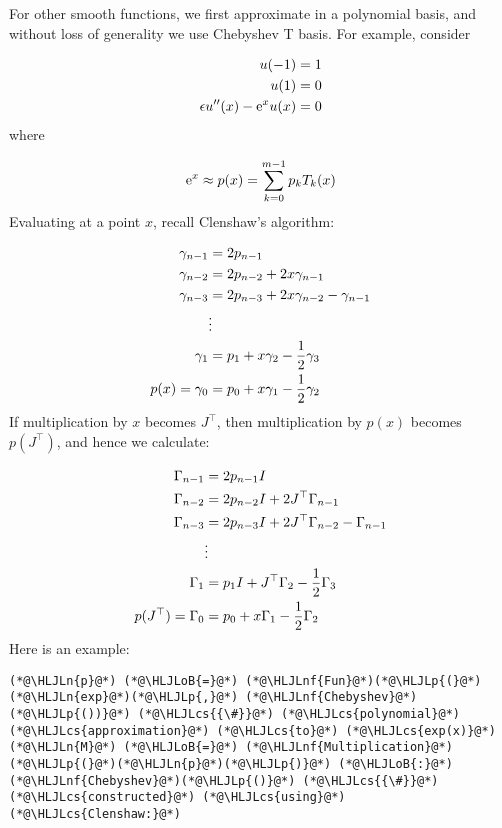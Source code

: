 \documentclass[12pt,landscape]{article}
\newcommand{\HLJLn}[1]{#1}
\newcommand{\HLJLnf}[1]{\textcolor[RGB]{66,102,213}{#1}}
\newcommand{\HLJLoB}[1]{\textcolor[RGB]{102,102,102}{\textbf{#1}}}
\newcommand{\HLJLp}[1]{#1}
\newcommand{\HLJLcs}[1]{\textcolor[RGB]{153,153,119}{\textit{#1}}}
\def\half{ {1 \over 2} }
\def\E{ {\rm e} }
\begin{document}
{For other smooth functions, we first approximate in a polynomial basis,  and without loss of generality we use Chebyshev T basis. For example, consider


\begin{align*}
u(-1) &= 1\\
u(1) &= 0\\
\epsilon u''(x) - \E^x u(x) &= 0
\end{align*}
where

\[
\E^x  \approx p(x) = \sum_{k=0}^{m-1} p_k T_k(x)
\]
Evaluating at a point $x$, recall Clenshaw's algorithm:


\begin{align*}
\gamma_{n-1} &= 2p_{n-1} \\
\gamma_{n-2} &= 2p_{n-2} + 2x \gamma_{n-1} \\
\gamma_{n-3} &= 2 p_{n-3} + 2x \gamma_{n-2} - \gamma_{n-1} \\
& \vdots \\
\gamma_1 &= p_1 + x \gamma_2 - \half \gamma_3 \\
p(x) = \gamma_0 &= p_0 + x \gamma_1 - \half \gamma_2
\end{align*}
If multiplication by $x$ becomes $J^\top$, then multiplication by $p(x)$ becomes $p(J^\top)$, and hence we calculate:


\begin{align*}
\Gamma_{n-1} &= 2p_{n-1}I \\
\Gamma_{n-2} &= 2p_{n-2}I + 2J^\top \Gamma_{n-1} \\
\Gamma_{n-3} &= 2 p_{n-3}I + 2J^\top \Gamma_{n-2} - \Gamma_{n-1} \\
& \vdots \\
\Gamma_1 &= p_1I + J^\top \Gamma_2 - \half \Gamma_3 \\
p(J^\top) = \Gamma_0 &= p_0 + x \Gamma_1 - \half \Gamma_2
\end{align*}
Here is an example:


\begin{lstlisting}
(*@\HLJLn{p}@*) (*@\HLJLoB{=}@*) (*@\HLJLnf{Fun}@*)(*@\HLJLp{(}@*)(*@\HLJLn{exp}@*)(*@\HLJLp{,}@*) (*@\HLJLnf{Chebyshev}@*)(*@\HLJLp{())}@*) (*@\HLJLcs{{\#}}@*) (*@\HLJLcs{polynomial}@*) (*@\HLJLcs{approximation}@*) (*@\HLJLcs{to}@*) (*@\HLJLcs{exp(x)}@*)
(*@\HLJLn{M}@*) (*@\HLJLoB{=}@*) (*@\HLJLnf{Multiplication}@*)(*@\HLJLp{(}@*)(*@\HLJLn{p}@*)(*@\HLJLp{)}@*) (*@\HLJLoB{:}@*) (*@\HLJLnf{Chebyshev}@*)(*@\HLJLp{()}@*) (*@\HLJLcs{{\#}}@*) (*@\HLJLcs{constructed}@*) (*@\HLJLcs{using}@*) (*@\HLJLcs{Clenshaw:}@*)


\end{lstlisting}}
\end{document}
